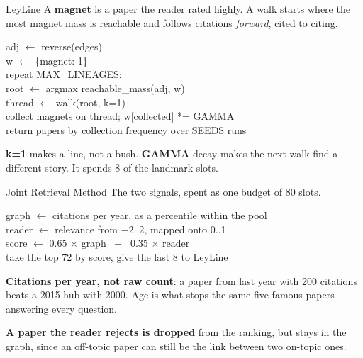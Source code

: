 \documentclass[aspectratio=169, 11pt]{beamer}
\let\oldtextbf\textbf
\renewcommand{\textbf}[1]{{\color{ktertiary}\oldtextbf{#1}}}
\let\oldemph\emph
\renewcommand{\emph}[1]{{\color{ksecondary}\oldemph{#1}}}
\begin{document}
\begin{frame}{LeyLine}
  A \textbf{magnet} is a paper the reader rated highly. A walk starts where the most magnet mass
  is reachable and follows citations \emph{forward}, cited to citing.
  \begin{kbox}{}
  {\scriptsize\ttfamily
  adj $\leftarrow$ reverse(edges)\\
  w $\leftarrow$ \{magnet: 1\}\\
  repeat MAX\_LINEAGES:\\
  \hspace*{1.2em} root $\leftarrow$ argmax reachable\_mass(adj, w)\\
  \hspace*{1.2em} thread $\leftarrow$ walk(root, k=1)\\
  \hspace*{1.2em} collect magnets on thread; w[collected] *= GAMMA\\
  return papers by collection frequency over SEEDS runs
  }
  \end{kbox}
  \textbf{k=1} makes a line, not a bush. \textbf{GAMMA} decay makes the next walk find a
  different story. It spends 8 of the landmark slots.
\end{frame}

\begin{frame}{Joint Retrieval Method}
  The two signals, spent as one budget of 80 slots.
  \begin{kbox}{}
  {\scriptsize\ttfamily
  graph  $\leftarrow$ citations per year, as a percentile within the pool\\
  reader $\leftarrow$ relevance from $-2..2$, mapped onto 0..1\\
  score  $\leftarrow$ 0.65 $\times$ graph \ + \ 0.35 $\times$ reader\\
  take the top 72 by score, give the last 8 to LeyLine
  }
  \end{kbox}
  \textbf{Citations per year, not raw count}: a paper from last year with 200 citations beats a
  2015 hub with 2000. Age is what stops the same five famous papers answering every question.
  \medskip

  \textbf{A paper the reader rejects is dropped} from the ranking, but stays in the graph, since
  an off-topic paper can still be the link between two on-topic ones.
\end{frame}
\end{document}
